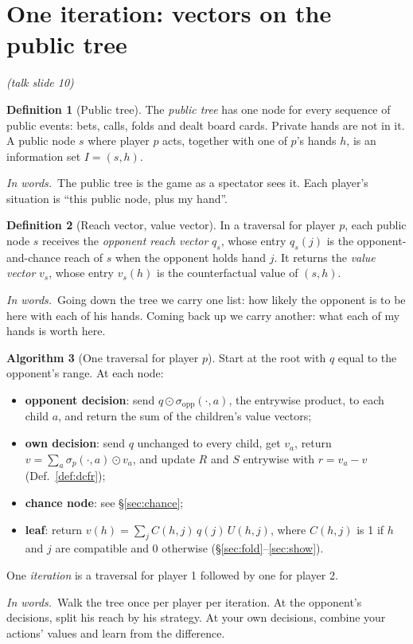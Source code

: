 \documentclass[11pt]{article}
\theoremstyle{definition}
\newtheorem{definition}{Definition}[section]
\newtheorem{algorithm}[definition]{Algorithm}
\newcommand{\inwords}{\par\smallskip\noindent\textit{In words.}\ }
\newcommand{\Def}[1]{Def.~\ref{#1}}\newcommand{\Lem}[1]{Lemma~\ref{#1}}\newcommand{\Thm}[1]{Thm.~\ref{#1}}
\newcommand{\slide}[1]{\hfill{\small\itshape (talk slide #1)}}
\begin{document}
\section{One iteration: vectors on the public tree}\label{sec:public}\slide{10}
\begin{definition}[Public tree]\label{def:public}
The \emph{public tree} has one node for every sequence of public events: bets, calls, folds and dealt board cards. Private
hands are not in it. A public node $s$ where player $p$ acts, together with one of $p$'s hands $h$, is an information set
$I=(s,h)$.
\inwords The public tree is the game as a spectator sees it. Each player's situation is ``this public node, plus my
hand''.
\end{definition}

\begin{definition}[Reach vector, value vector]\label{def:vectors}
In a traversal for player $p$, each public node $s$ receives the \emph{opponent reach vector} $q_s$, whose entry $q_s(j)$ is
the opponent-and-chance reach of $s$ when the opponent holds hand $j$. It returns the \emph{value vector} $v_s$, whose entry
$v_s(h)$ is the counterfactual value of $(s,h)$.
\inwords Going down the tree we carry one list: how likely the opponent is to be here with each of his hands. Coming back
up we carry another: what each of my hands is worth here.
\end{definition}

\begin{algorithm}[One traversal for player $p$]\label{alg:trav}
Start at the root with $q$ equal to the opponent's range. At each node:
\begin{itemize}[nosep]
\item \textbf{opponent decision}: send $q\odot\sigma_{\text{opp}}(\cdot,a)$, the entrywise product, to each child $a$, and
return the sum of the children's value vectors;
\item \textbf{own decision}: send $q$ unchanged to every child, get $v_a$, return $v=\sum_a\sigma_p(\cdot,a)\odot v_a$, and update
$R$ and $S$ entrywise with $r=v_a-v$ (\Def{def:dcfr});
\item \textbf{chance node}: see \S\ref{sec:chance};
\item \textbf{leaf}: return $v(h)=\sum_jC(h,j)\,q(j)\,U(h,j)$, where $C(h,j)$ is 1 if $h$ and $j$ are compatible and 0
otherwise (\S\ref{sec:fold}--\ref{sec:show}).
\end{itemize}
One \emph{iteration} is a traversal for player 1 followed by one for player 2.
\inwords Walk the tree once per player per iteration. At the opponent's decisions, split his reach by his strategy. At
your own decisions, combine your actions' values and learn from the difference.
\end{algorithm}
\end{document}
